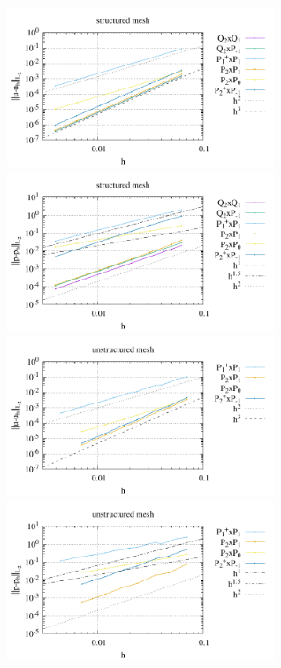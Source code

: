 \begin{center}
\includegraphics[width=8cm]{python_codes/fieldstone_120/paperresults/johnbook_structured_errorsV.pdf}
\includegraphics[width=8cm]{python_codes/fieldstone_120/paperresults/johnbook_structured_errorsP.pdf}\\
\includegraphics[width=8cm]{python_codes/fieldstone_120/paperresults/johnbook_unstructured_errorsV.pdf}
\includegraphics[width=8cm]{python_codes/fieldstone_120/paperresults/johnbook_unstructured_errorsP.pdf}\\
\end{center}


